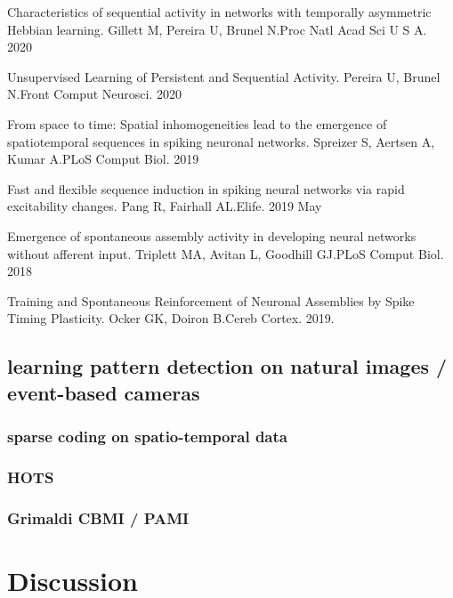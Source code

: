 \documentclass[brainsci, %
               review,submit,pdftex,moreauthors%
               ]{Definitions/mdpi}
\begin{document}
Characteristics of sequential activity in networks with temporally asymmetric Hebbian learning.
Gillett M, Pereira U, Brunel N.Proc Natl Acad Sci U S A. 2020

Unsupervised Learning of Persistent and Sequential Activity.
Pereira U, Brunel N.Front Comput Neurosci. 2020

From space to time: Spatial inhomogeneities lead to the emergence of spatiotemporal sequences in spiking neuronal networks.
Spreizer S, Aertsen A, Kumar A.PLoS Comput Biol. 2019

Fast and flexible sequence induction in spiking neural networks via rapid excitability changes.
Pang R, Fairhall AL.Elife. 2019 May~\citep{pang_fast_2019}

Emergence of spontaneous assembly activity in developing neural networks without afferent input.
Triplett MA, Avitan L, Goodhill GJ.PLoS Comput Biol. 2018

Training and Spontaneous Reinforcement of Neuronal Assemblies by Spike Timing Plasticity.
Ocker GK, Doiron B.Cereb Cortex. 2019.


\subsection{learning pattern detection on natural images / event-based cameras}\label{learning-pattern-detection-on-natural-images-event-based-cameras}
\subsubsection{sparse coding on spatio-temporal data}\label{sparse-coding-on-spatio-temporal-data}
\subsubsection{HOTS}\label{hots}
\subsubsection{Grimaldi CBMI / PAMI}\label{grimaldi-cbmi-pami}
\section{Discussion}\label{discussion}
\end{document}
